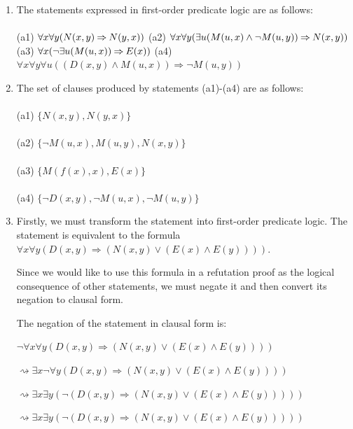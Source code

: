 \documentclass[12pt]{article}
\newcommand{\impl}{\mathbin{\Rightarrow}}
\begin{document}
\begin{enumerate}
  \item The statements expressed in first-order predicate logic are as follows:\\\\
	  (a1) $\forall x \forall y(N(x,y) \impl N(y,x))\\\\$
        (a2) $\forall x \forall y (\exists u(M(u,x) \land \neg M(u,y)) \impl N(x,y))\\\\$
        (a3) $\forall x(\neg \exists u(M(u,x)) \impl E(x))\\\\$
        (a4) $\forall x \forall y \forall u((D(x,y) \land M(u,x)) \impl \neg M(u,y))$\\

  \item The set of clauses produced by statements (a1)-(a4) are as follows:\\
\\(a1) $\{N(x,y), N(y,x)\}$\\
\\(a2) $\{\neg M(u,x), M(u,y), N(x,y)\}$\\
\\(a3) $\{M(f(x), x), E(x)\}$\\
\\(a4) $\{\neg D(x,y), \neg M(u,x), \neg M(u,y)\}$

  \item Firstly, we must transform the statement into first-order predicate logic. The statement is equivalent to the formula $\forall x \forall y(D(x,y) \impl (N(x,y) \lor (E(x) \land E(y))))$.

\bigskip
Since we would like to use this formula in a refutation proof as the logical consequence of other statements, we must negate it and then convert its negation to clausal form.

\bigskip
The negation of the statement in clausal form is: 

$\neg \forall x \forall y(D(x,y) \impl (N(x,y) \lor (E(x) \land E(y))))$

$\rightsquigarrow \exists x \neg \forall y(D(x,y) \impl (N(x,y) \lor (E(x) \land E(y))))$

$\rightsquigarrow \exists x \exists y(\neg (D(x,y) \impl (N(x,y) \lor (E(x) \land E(y)))))$

$\rightsquigarrow \exists x \exists y(\neg (D(x,y) \impl (N(x,y) \lor (E(x) \land E(y)))))$


\end{enumerate}
\end{document}
